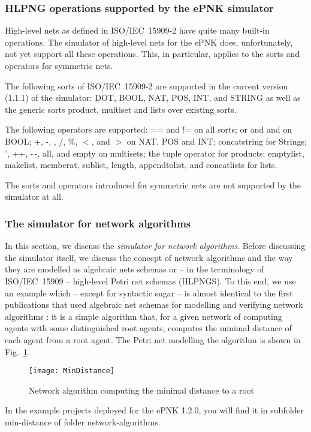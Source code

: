 \subsubsection{HLPNG operations supported by the ePNK simulator}
\label{subsubsec:user:sim:supported}

High-level nets as defined in ISO/IEC~15909-2 have quite many built-in operations.
The simulator of high-level nets for the ePNK does, unfortunately, not yet
support all these operations. This,
in particular, applies to the sorts and operators for symmetric nets.

The following sorts of ISO/IEC~15909-2 are supported in the current
version (1.1.1) of the simulator: {\sf DOT}, {\sf BOOL}, {\sf NAT}, {\sf POS},
{\sf INT}, and {\sf STRING} as well as the generic sorts product, multiset
and lists over existing sorts.

The following operators are supported:
{\sf ==} and {\sf !=} on all sorts;
{\sf or} and {\sf and} on {\sf BOOL};
{\sf +}, {\sf -},  {\sf *},  {\sf /}, {\sf \%}, $<$,  and $>$ on
{\sf NAT}, {\sf POS} and {\sf INT};
{\sf concatstring} for Strings;
{\sf '}, {\sf ++}, {\sf -\,-}, {\sf all}, and {\sf empty} on multisets;
the tuple operator for products; 
{\sf emptylist}, {\sf makelist}, {\sf memberat}, {\sf sublist}, {\sf length},
{\sf appendtolist}, and {\sf concatlists} for lists.

The sorts and operators introduced for symmetric nets are not
supported by the simulator at all.
 
\subsubsection{The simulator for network algorithms}
\label{subsubsec:user:sim:networks}

In this section, we discuss the \emph{simulator for network algorithms}.%
Before discussing the simulator itself, we discuss the concept of network
algorithms and the way they are modelled as algebraic nets schemas
or -- in the terminology of ISO/IEC~15909 -- high-level Petri net schemas
(HLPNGS).%
To this end, we use an example which -- except for syntactic sugar --
is almost identical to the first publications that used algebraic
net schemas for modelling and verifying network algorithms%
\cite{KiRe96, WWea97, Rei98}: it is a simple algorithm that, for a given network
of computing agents with some distinguished root agents, computes the
minimal distance of each agent from a root agent. The Petri net modelling
the algorithm is shown in Fig.~\ref{fig:user:sim:mindistance-exmpl}.%
%
\begin{figure}[hbt!!]
  \centerline{\texttt{[image: MinDistance]}}
  \caption{Network algorithm computing the minimal distance to a root}
  \label{fig:user:sim:mindistance-exmpl}
\end{figure}
%
In the example projects deployed for the ePNK 1.2.0, you will find it
in subfolder min-distance of folder network-algorithms.

